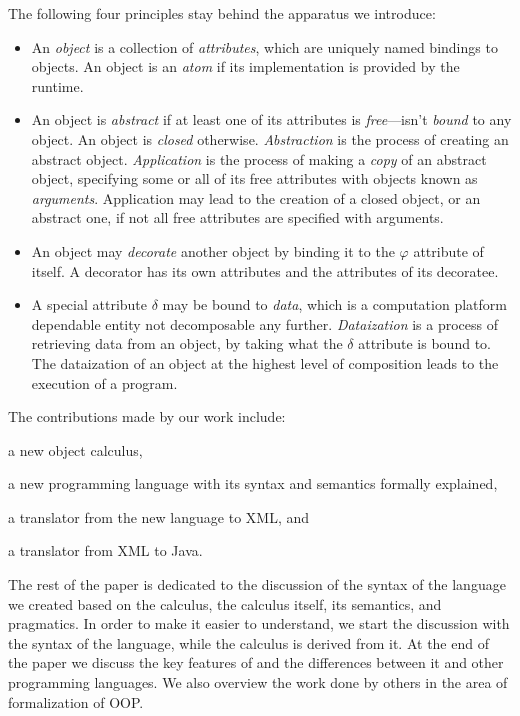 The following four principles stay behind the
apparatus we introduce:

\begin{itemize}
\item An \emph{object} is a collection of \emph{attributes},
which are uniquely named bindings to objects. An object
is an \emph{atom} if its implementation is provided by the runtime.

\item An object is \emph{abstract} if at least one of its attributes
is \emph{free}---isn't \emph{bound} to any object. An object
is \emph{closed} otherwise.
\emph{Abstraction} is the process of creating an abstract object.
\emph{Application} is the process of making a \emph{copy} of an abstract
object, specifying some or all of its free attributes with
objects known as \emph{arguments}. Application may lead to the
creation of a closed object, or an abstract one, if not all free
attributes are specified with arguments.

\item An object may \emph{decorate} another object by binding it
to the $\varphi$ attribute of itself. A decorator has its
own attributes and the attributes of its decoratee.

\item A special attribute $\delta$ may be bound to \emph{data},
which is a computation platform dependable entity not
decomposable any further.
\emph{Dataization} is a process of retrieving data from an object,
by taking what the $\delta$ attribute is bound to.
The dataization of an object at the highest level of composition
leads to the execution of a program.
\end{itemize}

The contributions made by our work include:
\begin{inparaenum}[1)]
  \item a new object calculus,
  \item a new programming language with its syntax and semantics formally explained,
  \item a translator from the new language to XML,
  and
  \item a translator from XML to Java.
\end{inparaenum}

The rest of the paper is dedicated to the discussion of the
syntax of the language we created based on the calculus,
the calculus itself, its semantics, and pragmatics.
In order to make it easier to understand, we start
the discussion with the syntax of the language, while the calculus
is derived from it. At the end of the paper we discuss the
key features of \eo{} and the differences between it and other
programming languages.
We also overview the work done by others in the area of
formalization of OOP.

